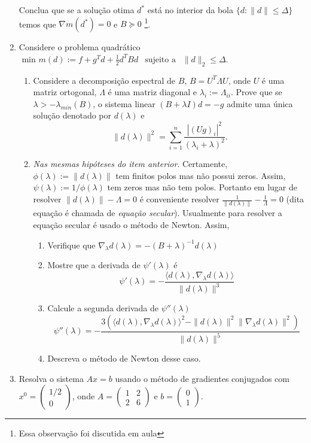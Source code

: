 \documentclass[a4paper,latin]{article}
\begin{document}
\begin{enumerate}
    Conclua que se a solução otima $d^{*}$ está no interior da bola $\{d:\|d\|\leq \Delta\}$ temos que $\nabla m(d^*)=0$ e $B \succeq 0$ \footnote{Essa observação foi discutida em aula}.
    \item Considere o problema quadrático 
    $
    \text{ min } m(d):=f+g^{T}d+\frac{1}{2} d^{T}Bd 
    \ \ \text{ sujeito a } \ \ 
    \|d\|_2 \leq \Delta $. 
       \begin{enumerate}
       	\item Considere a decomposição espectral de $B$, 
       	$B=U ^{T}\Lambda U$, onde $U$ é uma matriz ortogonal, 
       	$\Lambda$ é uma matriz diagonal e $\lambda_i:=\Lambda_{ii}$.
       	Prove que se $\lambda>-\lambda_{min}(B)$, o sistema linear $(B+\lambda I)d=-g$ admite uma única solução 
       	denotado por $d(\lambda)$ e
       	 $$  \|d(\lambda)\|^{2}= \sum_{i=1}^{n} \frac{|(Ug)_i|^{2}}{(\lambda_i+\lambda)^2}.$$
       	\item {\it Nas mesmas hipóteses do item anterior}. Certamente, 
       	$\phi(\lambda):=\|d(\lambda)\|$ tem finitos polos mas não possui zeros. 
       	Assim, $\psi(\lambda):=1/\phi(\lambda)$ tem zeros mas não tem polos. Portanto em lugar de resolver $\|d(\lambda)\|-\Lambda=0$
       	é conveniente resolver $\frac{1}{\|d(\lambda)\|}-\frac{1}{\Lambda}=0$ (dita equação é chamada de {\it equação secular}). Usualmente para resolver a equação secular é usado o método de Newton. Assim,
       	   \begin{enumerate}
       	   	\item Verifique que $\nabla_{\lambda} d(\lambda)=-(B+\lambda)^{-1} d(\lambda)$
       	   	\item Mostre que a derivada de $\psi'(\lambda)$ é  $$\psi'(\lambda)=-\frac{\langle d(\lambda),
       	   	\nabla_{\lambda} d(\lambda)\rangle}{\|d(\lambda)\|^{3}}$$
          	\item Calcule  a segunda derivada de $\psi''(\lambda)$  $$\psi''(\lambda)=
          	-\frac{3(\langle d(\lambda),
          		\nabla_{\lambda} d(\lambda)\rangle^{2}-\|d(\lambda)\|^{2}\|\nabla_{\lambda} d(\lambda)\|^2)}{\|d(\lambda)\|^{5}}$$
          	\item Descreva o método de Newton desse caso.
       	   \end{enumerate}
       \end{enumerate}
    \item Resolva o sistema $Ax=b$ usando o método de gradientes conjugados com 
    $x^0=\begin{pmatrix}
    1/2 \\
    0 
    \end{pmatrix}$, onde 
    $A=\begin{pmatrix}
    	1 & 2 \\
    	2 & 6
    \end{pmatrix}$ e 
    $b=\begin{pmatrix}
    0 \\
    1 
    \end{pmatrix}$.
      

\end{enumerate}
\end{document}
